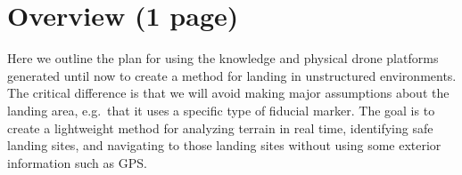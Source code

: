 \section{Overview (1 page)}
\label{section:research_plan_overview}

Here we outline the plan for using the knowledge and physical drone platforms generated
until now to create a method for landing in unstructured environments.
The critical difference is that we will avoid making major assumptions about the landing area,
e.g.~that it uses a specific type of fiducial marker.
The goal is to create a lightweight method for analyzing terrain in real time,
identifying safe landing sites,
and navigating to those landing sites without using some exterior information such as GPS.